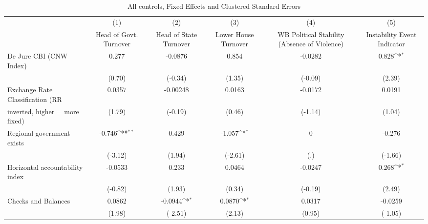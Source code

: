 \begin{table}[htbp]\centering
\def\sym#1{\ifmmode^{#1}\else\(^{#1}\)\fi}
\caption{All controls, Fixed Effects and Clustered Standard Errors \label{fullcmultIndFEDJ}}
\begin{tabular}{l*{5}{c}}
\toprule
                                        &\multicolumn{1}{c}{(1)}&\multicolumn{1}{c}{(2)}&\multicolumn{1}{c}{(3)}&\multicolumn{1}{c}{(4)}&\multicolumn{1}{c}{(5)}\\
                                        &\multicolumn{1}{c}{Head of Govt. Turnover}&\multicolumn{1}{c}{Head of State Turnover}&\multicolumn{1}{c}{Lower House Turnover}&\multicolumn{1}{c}{WB Political Stability (Absence of Violence)}&\multicolumn{1}{c}{Instability Event Indicator}\\
\midrule
De Jure CBI (CNW Index)                 &    0.277         &  -0.0876         &    0.854         &  -0.0282         &    0.828\sym{*}  \\
                                        &   (0.70)         &  (-0.34)         &   (1.35)         &  (-0.09)         &   (2.39)         \\
\addlinespace
Exchange Rate Classification (RR        &   0.0357         & -0.00248         &   0.0163         &  -0.0172         &   0.0191         \\
inverted, higher = more fixed)          &   (1.79)         &  (-0.19)         &   (0.46)         &  (-1.14)         &   (1.04)         \\
\addlinespace
Regional government exists              &   -0.746\sym{**} &    0.429         &   -1.057\sym{*}  &        0         &   -0.276         \\
                                        &  (-3.12)         &   (1.94)         &  (-2.61)         &      (.)         &  (-1.66)         \\
\addlinespace
Horizontal accountability index         &  -0.0533         &    0.233         &   0.0464         &  -0.0247         &    0.268\sym{*}  \\
                                        &  (-0.82)         &   (1.93)         &   (0.34)         &  (-0.19)         &   (2.49)         \\
\addlinespace
Checks and Balances                     &   0.0862         &  -0.0944\sym{*}  &   0.0870\sym{*}  &   0.0317         &  -0.0259         \\
                                        &   (1.98)         &  (-2.51)         &   (2.13)         &   (0.95)         &  (-1.05)         \\

\end{tabular}
\end{table}
